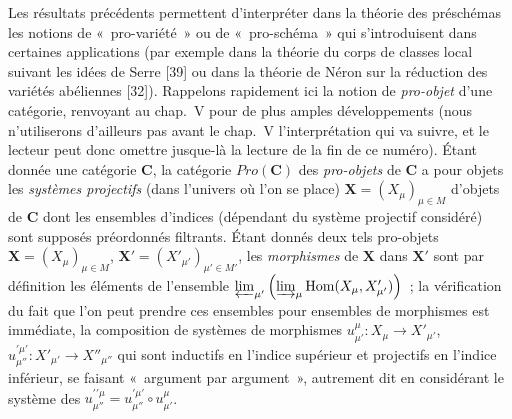 \begin{env}[8.13.3]
\label{IV.8.13.3-fr}
Les résultats précédents permettent d'interpréter dans la théorie des
préschémas les notions de «~pro-variété~» ou de «~pro-schéma~» qui
s'introduisent dans certaines applications (par exemple dans la théorie du
corps de classes local suivant les idées de Serre [39] ou dans la théorie de
Néron sur la réduction des variétés
abéliennes [32]). Rappelons rapidement ici la notion de \emph{pro-objet} d'une
catégorie, renvoyant au chap.~V pour de plus amples développements (nous
n'utiliserons d'ailleurs pas avant le chap.~V l'interprétation qui va suivre,
et le lecteur peut donc omettre jusque-là la lecture de la fin de ce numéro).
Étant donnée une catégorie $\boldsymbol{C}$, la catégorie
$\boldsymbol{\mathit{Pro}}(\boldsymbol{C})$ des \emph{pro-objets} de $\boldsymbol{C}$ a pour objets
les \emph{systèmes projectifs} (dans l'univers où l'on se place)
$\mathbf X=(X_\mu)_{\mu\in M}$ d'objets de $\boldsymbol{C}$ dont les ensembles
d'indices (dépendant du système projectif considéré) sont supposés préordonnés
filtrants. Étant donnés deux tels pro-objets
$\mathbf X=(X_\mu)_{\mu\in M}$,
$\mathbf X'=(X'_{\mu'})_{\mu'\in M'}$, les \emph{morphismes} de $\mathbf X$
dans $\mathbf X'$ sont par définition les éléments de l'ensemble
$\varprojlim_{\mu'}\left(\varinjlim_\mu
\operatorname{Hom}(X_\mu,X'_{\mu'})\right)$~;
la vérification du fait que l'on peut prendre ces ensembles pour ensembles de
morphismes est immédiate, la composition de systèmes de morphismes
$u_{\mu'}^\mu:X_\mu\to X'_{\mu'}$,
$u_{\mu''}^{\prime\mu'}:X'_{\mu'}\to X''_{\mu''}$ qui sont inductifs en
l'indice supérieur et projectifs en l'indice inférieur, se faisant
«~argument par argument~», autrement dit en considérant le système des
$u_{\mu''}^{\prime\prime\mu}=u_{\mu''}^{\prime\mu'}\circ u_{\mu'}^\mu$.
\end{env}

